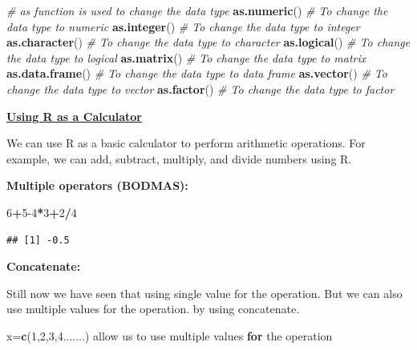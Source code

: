 \documentclass[
]{article}
\newenvironment{Shaded}{\begin{snugshade}}{\end{snugshade}}
\newcommand{\CommentTok}[1]{\textcolor[rgb]{0.56,0.35,0.01}{\textit{#1}}}
\newcommand{\ControlFlowTok}[1]{\textcolor[rgb]{0.13,0.29,0.53}{\textbf{#1}}}
\newcommand{\DecValTok}[1]{\textcolor[rgb]{0.00,0.00,0.81}{#1}}
\newcommand{\FunctionTok}[1]{\textcolor[rgb]{0.13,0.29,0.53}{\textbf{#1}}}
\newcommand{\NormalTok}[1]{#1}
\newcommand{\OtherTok}[1]{\textcolor[rgb]{0.56,0.35,0.01}{#1}}
\newcommand{\SpecialCharTok}[1]{\textcolor[rgb]{0.81,0.36,0.00}{\textbf{#1}}}
\begin{document}
\begin{Shaded}
\begin{Highlighting}[]
\CommentTok{\# as function is used to change the data type}
\FunctionTok{as.numeric}\NormalTok{() }\CommentTok{\# To change the data type to numeric}
\FunctionTok{as.integer}\NormalTok{() }\CommentTok{\# To change the data type to integer}
\FunctionTok{as.character}\NormalTok{() }\CommentTok{\# To change the data type to character}
\FunctionTok{as.logical}\NormalTok{() }\CommentTok{\# To change the data type to logical}
\FunctionTok{as.matrix}\NormalTok{() }\CommentTok{\# To change the data type to matrix}
\FunctionTok{as.data.frame}\NormalTok{() }\CommentTok{\# To change the data type to data frame}
\FunctionTok{as.vector}\NormalTok{() }\CommentTok{\# To change the data type to vector}
\FunctionTok{as.factor}\NormalTok{() }\CommentTok{\# To change the data type to factor}
\end{Highlighting}
\end{Shaded}

\ul{\textbf{Using R as a Calculator}}

We can use R as a basic calculator to perform arithmetic operations. For
example, we can add, subtract, multiply, and divide numbers using R.

\textbf{Multiple operators (BODMAS):}

\begin{Shaded}
\begin{Highlighting}[]
 \DecValTok{6}\SpecialCharTok{+}\DecValTok{5{-}4}\SpecialCharTok{*}\DecValTok{3}\SpecialCharTok{+}\DecValTok{2}\SpecialCharTok{/}\DecValTok{4}
\end{Highlighting}
\end{Shaded}

\begin{verbatim}
## [1] -0.5
\end{verbatim}

\textbf{Concatenate:}

Still now we have seen that using single value for the operation. But we
can also use multiple values for the operation. by using concatenate.

\begin{Shaded}
\begin{Highlighting}[]
\NormalTok{x}\OtherTok{=}\FunctionTok{c}\NormalTok{(}\DecValTok{1}\NormalTok{,}\DecValTok{2}\NormalTok{,}\DecValTok{3}\NormalTok{,}\DecValTok{4}\NormalTok{.......)}
\NormalTok{allow us to use multiple values }\ControlFlowTok{for}\NormalTok{ the operation}
\end{Highlighting}
\end{Shaded}
\end{document}

